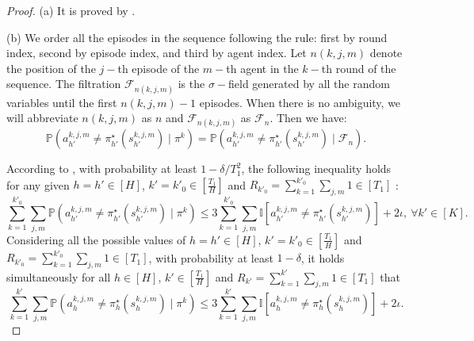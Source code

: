 \documentclass{article}
\begin{document}
\begin{proof}
    (a) It is proved by .

    (b) 
     We order all the episodes in the sequence following the rule: first by round index, second by episode index, and third by agent index. Let \( n(k,j,m) \) denote the position of the \( j -\)th episode of the \( m -\)th agent in the \( k -\)th round of the sequence. The filtration \( \mathcal{F}_{n(k,j,m)} \) is the \( \sigma -\)field generated by all the random variables until the first \( n(k,j,m)-1 \) episodes. When there is no ambiguity, we will abbreviate \( n(k,j,m) \) as \( n \) and \( \mathcal{F}_{n(k,j,m)} \) as \( \mathcal{F}_n \). Then we have:
     $$\mathbb{P}\left(a_{h'}^{k,j,m} \neq \pi_{h'}^{\star}(s_{h'}^{k,j,m}) \mid \pi^k \right) = \mathbb{P}\left(a_{h'}^{k,j,m} \neq \pi_{h'}^{\star}(s_{h'}^{k,j,m}) \mid \mathcal{F}_n\right).$$
     
    According to , with probability at least $1- \delta/T_1^2$, the following inequality holds for any given $h = h' \in [H]$,  $k' = k'_0 \in [\frac{T_1}{H}]$ and $R_{k'_0} = \sum_{k = 1}^{k'_0} \sum_{j,m} 1 \in [T_1]$ :
    $$\sum_{k = 1}^{k'_0} \sum_{j,m}\mathbb{P}\left(a_{h'}^{k,j,m} \neq \pi_{h'}^{\star}(s_{h'}^{k,j,m}) \mid \pi^k\right) \leq 3\sum_{k = 1}^{k'_0} \sum_{j,m}\mathbb{I}\left[a_{h'}^{k,j,m} \neq \pi_{h'}^{\star}(s_{h'}^{k,j,m}) \right]+ 2\iota,\ \forall k' \in [K].$$
    Considering all the possible values of $h = h' \in [H]$, $k' = k'_0 \in [\frac{T_1}{H}]$ and $R_{k'_0} = \sum_{k = 1}^{k'_0} \sum_{j,m} 1 \in [T_1]$, with probability at least $1-\delta$, it holds simultaneously for all $h \in [H]$, $k' \in [\frac{T_1}{H}]$ and $R_{k'} = \sum_{k = 1}^{k'} \sum_{j,m} 1 \in [T_1]$ that
    $$\sum_{k = 1}^{k'} \sum_{j,m}\mathbb{P}\left(a_h^{k,j,m} \neq \pi_h^{\star}(s_h^{k,j,m}) \mid \pi^k\right) \leq 3\sum_{k = 1}^{k'} \sum_{j,m}\mathbb{I}\left[a_h^{k,j,m} \neq \pi_h^{\star}(s_h^{k,j,m}) \right]+ 2\iota.$$
    

\end{proof}
\end{document}
